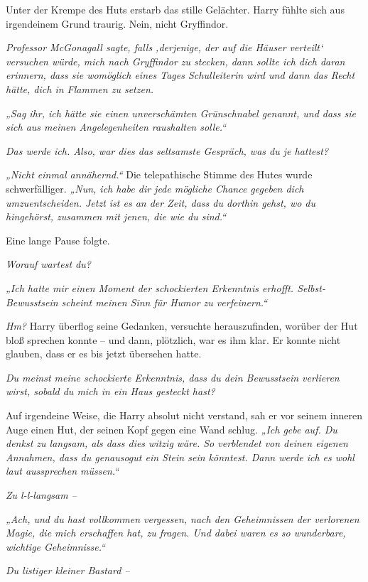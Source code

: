 Unter der Krempe des Huts erstarb das stille Gelächter. Harry fühlte sich aus irgendeinem Grund traurig. Nein, nicht Gryffindor. 

\emph{Professor McGonagall sagte, falls ‚derjenige, der auf die Häuser verteilt‘ versuchen würde, mich nach Gryffindor zu stecken, dann sollte ich dich daran erinnern, dass sie womöglich eines Tages Schulleiterin wird und dann das Recht hätte, dich in Flammen zu setzen. }

\emph{„Sag ihr, ich hätte sie einen unverschämten Grünschnabel genannt, und dass sie sich aus meinen Angelegenheiten raushalten solle.“ }

\emph{Das werde ich. Also, war dies das seltsamste Gespräch, was du je hattest? }

\emph{„Nicht einmal annähernd.“} Die telepathische Stimme des Hutes wurde schwerfälliger. \emph{„Nun, ich habe dir jede mögliche Chance gegeben dich umzuentscheiden. Jetzt ist es an der Zeit, dass du dorthin gehst, wo du hingehörst, zusammen mit jenen, die wie du sind.“} 

Eine lange Pause folgte. 

\emph{Worauf wartest du? }

\emph{„Ich hatte mir einen Moment der schockierten Erkenntnis erhofft. Selbst-Bewusstsein scheint meinen Sinn für Humor zu verfeinern.“ }

\emph{Hm?} Harry überflog seine Gedanken, versuchte herauszufinden, worüber der Hut bloß sprechen konnte – und dann, plötzlich, war es ihm klar. Er konnte nicht glauben, dass er es bis jetzt übersehen hatte. 

\emph{Du meinst meine schockierte Erkenntnis, dass du dein Bewusstsein verlieren wirst, sobald du mich in ein Haus gesteckt hast?} 

Auf irgendeine Weise, die Harry absolut nicht verstand, sah er vor seinem inneren Auge einen Hut, der seinen Kopf gegen eine Wand schlug. \emph{„Ich gebe auf. Du denkst zu langsam, als dass dies witzig wäre. So verblendet von deinen eigenen Annahmen, dass du genausogut ein Stein sein könntest. Dann werde ich es wohl laut aussprechen müssen.“ }

\emph{Zu l-l-langsam – }

\emph{„Ach, und du hast vollkommen vergessen, nach den Geheimnissen der verlorenen Magie, die mich erschaffen hat, zu fragen. Und dabei waren es so wunderbare, wichtige Geheimnisse.“ }

\emph{Du listiger kleiner \emph{Bastard} – }

